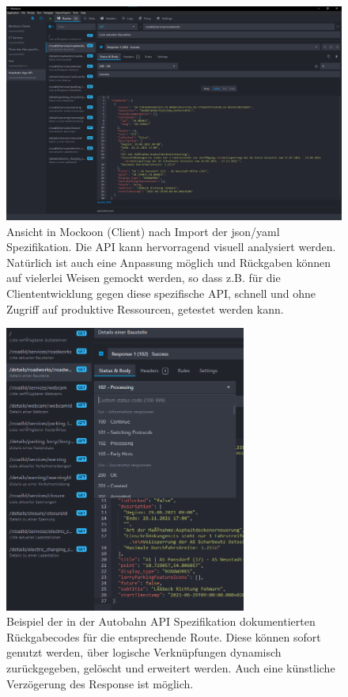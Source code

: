 \documentclass[notitlepage, hidelinks]{article}
\begin{document}
\begin{figure}[H]
\centering
  \includegraphics[width=\textwidth]{images/apispecs4.png}
  \caption{Ansicht in Mockoon (Client) nach Import der json/yaml Spezifikation. Die API kann hervorragend visuell analysiert werden. Natürlich ist auch eine Anpassung möglich und Rückgaben können auf vielerlei Weisen gemockt werden, so dass z.B. für die Cliententwicklung gegen diese spezifische API, schnell und ohne Zugriff auf produktive Ressourcen, getestet werden kann.}
  \label{apispecs4}
\end{figure}

\begin{figure}[H]
\centering
  \includegraphics[width=300px]{images/apispecs3.png}
  \caption{Beispiel der in der Autobahn API Spezifikation dokumentierten Rückgabecodes für die entsprechende Route. Diese können sofort genutzt werden, über logische Verknüpfungen dynamisch zurückgegeben, gelöscht und erweitert werden. Auch eine künstliche Verzögerung des Response ist möglich.}
  \label{apispecs3}
\end{figure}
\end{document}
